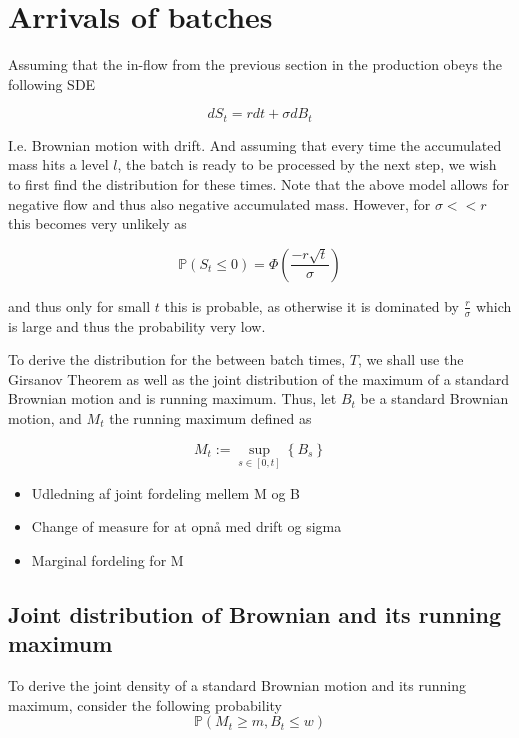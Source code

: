 \documentclass[../Thesis.tex]{subfiles}
\begin{document}
\cite{Hoare78}

\cite{CK01}



\newpage
\section{Arrivals of batches}
Assuming that the in-flow from the previous section in the production obeys the following SDE

$$dS_t = r dt + \sigma dB_t$$

I.e. Brownian motion with drift. And assuming that every time the accumulated mass hits a level $l$, the batch is ready to be processed by the next step, we wish to first find the distribution for these times. Note that the above model allows for negative flow and thus also negative accumulated mass. However, for $\sigma << r$ this becomes very unlikely as

$$\mathbb{P} \left( S_t \leq 0\right) = \Phi \left( \frac{-r \sqrt{t}}{\sigma } \right)$$

and thus only for small $t$ this is probable, as otherwise it is dominated by $\frac{r}{\sigma}$ which is large and thus the probability very low.


To derive the distribution for the between batch times, $T$, we shall use the Girsanov Theorem as well as the joint distribution of the maximum of a standard Brownian motion and is running maximum. Thus, let $B_t$ be a standard Brownian motion, and $M_t$ the running maximum defined as

$$M_t := \sup_{s\in [0,t]} \left\{ B_s \right\}$$


\begin{itemize}
    \item Udledning af joint fordeling mellem M og B
    \item Change of measure for at opnå med drift og sigma
    \item Marginal fordeling for M
\end{itemize}





\subsection{Joint distribution of Brownian and its running maximum}
To derive the joint density of a standard Brownian motion and its running maximum, consider the following probability
$$\mathbb{P}\left(M_t \geq m, B_t \leq w\right)$$
\end{document}
